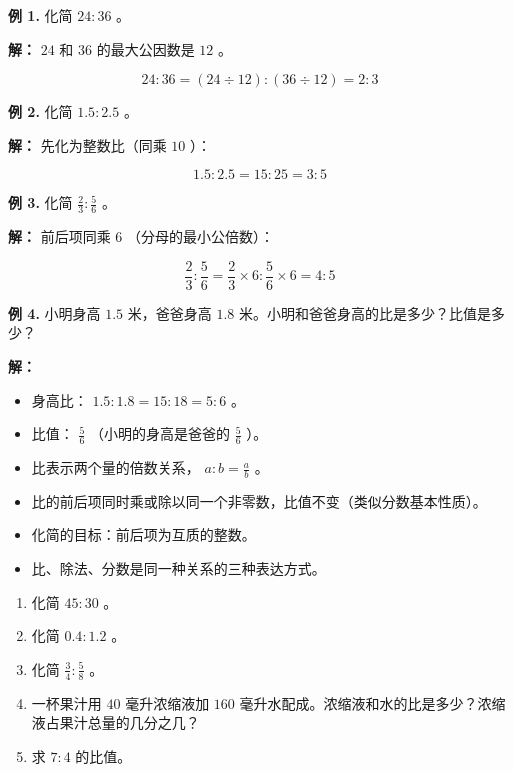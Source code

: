 \begin{workedexamples}


\textbf{例 1.} 化简 $24 : 36$ 。

\textbf{解：} $24$ 和 $36$ 的最大公因数是 $12$ 。

\[
24 : 36 = (24 \div 12) : (36 \div 12) = 2 : 3
\]


\textbf{例 2.} 化简 $1.5 : 2.5$ 。

\textbf{解：} 先化为整数比（同乘 $10$ ）：

\[
1.5 : 2.5 = 15 : 25 = 3 : 5
\]


\textbf{例 3.} 化简 $\frac{2}{3} : \frac{5}{6}$ 。

\textbf{解：} 前后项同乘 $6$ （分母的最小公倍数）：

\[
\frac{2}{3} : \frac{5}{6} = \frac{2}{3} \times 6 : \frac{5}{6} \times 6 = 4 : 5
\]


\textbf{例 4.} 小明身高 $1.5$ 米，爸爸身高 $1.8$ 米。小明和爸爸身高的比是多少？比值是多少？

\textbf{解：}
\begin{itemize}
  \item 身高比： $1.5 : 1.8 = 15 : 18 = 5 : 6$ 。
  \item 比值： $\frac{5}{6}$ （小明的身高是爸爸的 $\frac{5}{6}$ ）。
\end{itemize}


\end{workedexamples}

\begin{keytakeaway}


\begin{itemize}
  \item 比表示两个量的倍数关系， $a : b = \frac{a}{b}$ 。
  \item 比的前后项同时乘或除以同一个非零数，比值不变（类似分数基本性质）。
  \item 化简的目标：前后项为互质的整数。
  \item 比、除法、分数是同一种关系的三种表达方式。
\end{itemize}


\end{keytakeaway}

\begin{practice}


\begin{enumerate}
  \item 化简 $45 : 30$ 。
  \item 化简 $0.4 : 1.2$ 。
  \item 化简 $\frac{3}{4} : \frac{5}{8}$ 。
  \item 一杯果汁用 $40$ 毫升浓缩液加 $160$ 毫升水配成。浓缩液和水的比是多少？浓缩液占果汁总量的几分之几？
  \item 求 $7 : 4$ 的比值。
\end{enumerate}


\end{practice}

